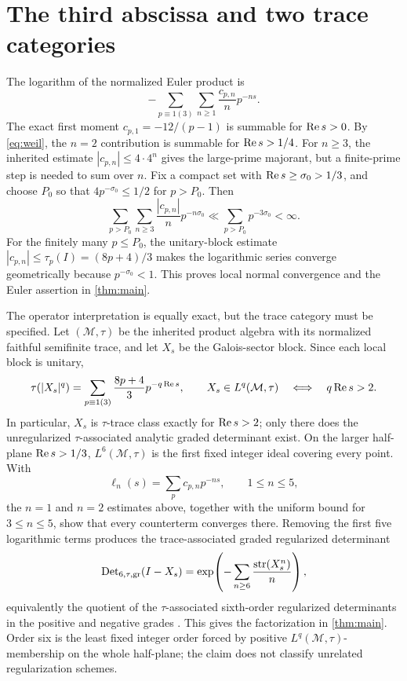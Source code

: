 \section{The third abscissa and two trace categories}

The logarithm of the normalized Euler product is
\[
 -\sum_{p\equiv1(3)}\sum_{n\ge1}\frac{c_{p,n}}n p^{-ns}.
\]
The exact first moment \(c_{p,1}=-12/(p-1)\) is summable for
\(\operatorname{Re} s>0\).  By \eqref{eq:weil}, the \(n=2\) contribution is summable
for \(\operatorname{Re} s>1/4\).  For \(n\ge3\), the inherited estimate
\(|c_{p,n}|\le4\cdot4^n\) gives the large-prime majorant, but a finite-prime
step is needed to sum over \(n\).  Fix a compact set with
\(\operatorname{Re} s\ge\sigma_0>1/3\), and choose \(P_0\) so that
\(4p^{-\sigma_0}\le1/2\) for \(p>P_0\).  Then
\[
 \sum_{p>P_0}\sum_{n\ge3}\frac{|c_{p,n}|}{n}p^{-n\sigma_0}
 \ll\sum_{p>P_0}p^{-3\sigma_0}<\infty.
\]
For the finitely many \(p\le P_0\), the unitary-block estimate
\(|c_{p,n}|\le\tau_p(I)=(8p+4)/3\) makes the logarithmic series converge
geometrically because \(p^{-\sigma_0}<1\).  This proves local normal
convergence and the Euler assertion in \cref{thm:main}.

The operator interpretation is equally exact, but the trace category must be
specified.  Let \((\mathcal M,\tau)\) be the inherited product algebra with
its normalized faithful semifinite trace, and let \(X_s\) be the
Galois-sector block.  Since each local block is unitary,
\[
 \tau(|X_s|^q)
 =\sum_{p\equiv1(3)}\frac{8p+4}{3}p^{-q\operatorname{Re} s},
 \qquad
 X_s\in L^q(\mathcal M,\tau)
 \quad\Longleftrightarrow\quad q\operatorname{Re} s>2.
\]
In particular, \(X_s\) is \(\tau\)-trace class exactly for
\(\operatorname{Re} s>2\); only there does the unregularized
\(\tau\)-associated analytic graded determinant exist.  On the larger
half-plane \(\operatorname{Re} s>1/3\), \(L^6(\mathcal M,\tau)\) is the first fixed
integer ideal covering every point.  With
\[
 \ell_n(s)=\sum_pc_{p,n}p^{-ns},\qquad1\le n\le5,
\]
the \(n=1\) and \(n=2\) estimates above, together with the uniform bound for
\(3\le n\le5\), show that every counterterm converges there.  Removing the
first five logarithmic terms produces the trace-associated graded
regularized determinant
\[
 \operatorname{Det}_{6,\tau,\mathrm{gr}}(I-X_s)
 =\exp\!\left(-\sum_{n\ge6}\frac{\operatorname{str}(X_s^n)}n\right),
\]
equivalently the quotient of the \(\tau\)-associated sixth-order regularized
determinants in the positive and negative grades
\cite[Chapter~9]{Simon2005}.  This gives the factorization in
\cref{thm:main}.  Order six is the least fixed integer order forced by
positive \(L^q(\mathcal M,\tau)\)-membership on the whole half-plane; the
claim does not classify unrelated regularization schemes.

